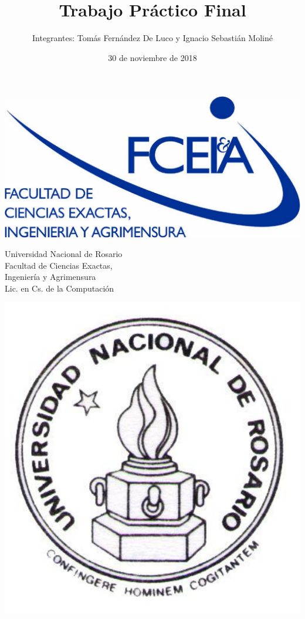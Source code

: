 \documentclass{article}
\title{Trabajo Práctico Final}
\author{Integrantes: Tomás Fernández De Luco y Ignacio Sebastián Moliné}
\date{30 de noviembre de 2018}
\begin{document}
\begin{titlepage}

\begin{minipage}{2.6cm}
\includegraphics[width=\textwidth]{fceia.pdf}
\end{minipage}
\hfill
%
\begin{minipage}{6cm}
\begin{center}
\normalsize{Universidad Nacional de Rosario\\
Facultad de Ciencias Exactas,\\
Ingeniería y Agrimensura\\}
\vspace{0.5cm}
\large
Lic. en Cs. de la Computación
\end{center}
\end{minipage}
\hspace{0.5cm}
\hfill
\begin{minipage}{2.6cm}
\includegraphics[width=\textwidth]{unr.pdf}
\end{minipage}


\end{titlepage}
\end{document}
